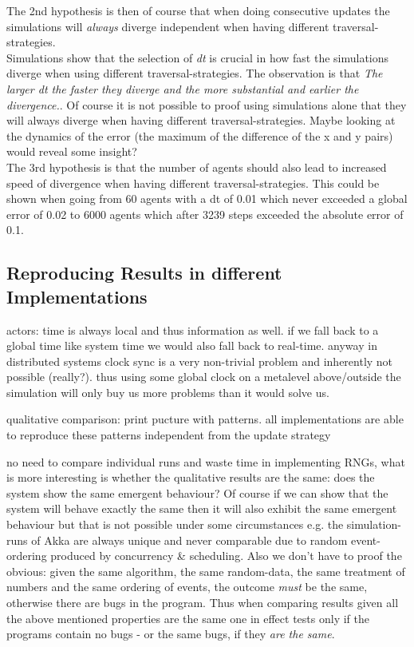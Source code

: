 The 2nd hypothesis is then of course that when doing consecutive updates the simulations will \textit{always} diverge independent when having different traversal-strategies. \\
Simulations show that the selection of \textit{dt} is crucial in how fast the simulations diverge when using different traversal-strategies. The observation is that \textit{The larger dt the faster they diverge and the more substantial and earlier the divergence.}. Of course it is not possible to proof using simulations alone that they will always diverge when having different traversal-strategies. Maybe looking at the dynamics of the error (the maximum of the difference of the x and y pairs) would reveal some insight? \\

The 3rd hypothesis is that the number of agents should also lead to increased speed of divergence when having different traversal-strategies. This could be shown when going from 60 agents with a dt of 0.01 which never exceeded a global error of 0.02 to 6000 agents which after 3239 steps exceeded the absolute error of 0.1.

\subsection{Reproducing Results in different Implementations}
actors: time is always local and thus information as well. if we fall back to a global time like system time we would also fall back to real-time. anyway in distributed systems clock sync is a very non-trivial problem and inherently not possible (really?). thus using some global clock on a metalevel above/outside the simulation will only buy us more problems than it would solve us. 

qualitative comparison: print pucture with patterns. all implementations are able to reproduce these patterns independent from the update strategy

no need to compare individual runs and waste time in implementing RNGs, what is more interesting is whether the qualitative results are the same: does the system show the same emergent behaviour? Of course if we can show that the system will behave exactly the same then it will also exhibit the same emergent behaviour but that is not possible under some circumstances e.g. the simulation-runs of Akka are always unique and never comparable due to random event-ordering produced by concurrency \& scheduling. Also we don't have to proof the obvious: given the same algorithm, the same random-data, the same treatment of numbers and the same ordering of events, the outcome \textit{must} be the same, otherwise there are bugs in the program. Thus when comparing results given all the above mentioned properties are the same one in effect tests only if the programs contain no bugs - or the same bugs, if they \textit{are the same}. \\

